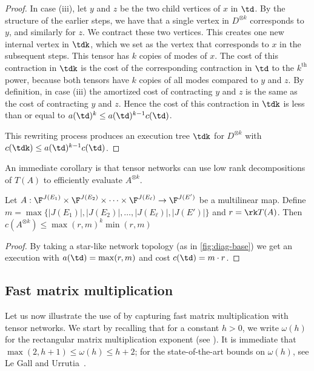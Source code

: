 \begin{proof}
In case (iii), let $y$ and $z$ be the two child vertices of $x$ in $\td$.
By the structure of the earlier steps, we have that a single vertex in
$D^{\otimes k}$ corresponds to $y$,
and similarly for $z$. We contract these two vertices. This creates one new
internal vertex in $\tdk$, which we set as the vertex that corresponds
to $x$ in the subsequent steps. This tensor has $k$ copies of modes of $x$. The cost of this contraction in $\tdk$ is the cost of the corresponding contraction in $\td$ to the $k^\text{th}$ power, because both tensors have $k$ copies of all modes compared to $y$ and $z$. By definition, in case (iii) the amortized cost of contracting $y$ and $z$ is the same as the cost of contracting $y$ and $z$. Hence the cost of this contraction in $\tdk$ is less than or equal to $a(\td)^k \leq a(\td)^{k-1} c(\td)$.

This rewriting process produces an execution tree $\tdk$
for $D^{\otimes k}$ with $c(\tdk)\leq a(\td)^{k-1} c(\td)$.
\end{proof}

An immediate corollary is that tensor networks can use low rank
decompositions of $T(A)$ to efficiently evaluate $A^{\otimes k}$.

\begin{corollary}
  \label{cor:low rank execution}
  Let $A: \F^{J(E_1)} \times \F^{J(E_2)} \times \cdots \times
  \F^{J(E_\ell)} \rightarrow \F^{J(E')}$ be a multilinear map.  Define
  $m \!=\! \max\{|J(E_1)|, |J(E_2)|, \ldots, |J(E_\ell)|, |J(E')|\}$ and
  $r = \rk T(A)$.  Then $c(A^{\otimes k}) \le \max(r, m)^{k} \min(r, m)$
\end{corollary}

\begin{proof}
  By taking a star-like network topology (as in \eqref{fig:diag-base})
  we get an execution with $a(\td) = \max(r, m)$ and cost $c(\td) = m \cdot
  r$.
\end{proof}



\subsection{Fast matrix multiplication}
\label{sec:matrix mul upper bound}

Let us now illustrate the use of  by capturing
fast matrix multiplication with tensor networks. We start by recalling that
for a constant $h>0$, we write $\omega(h)$ for the rectangular matrix
multiplication exponent
(see ). %
It is immediate that
$\max(2,h+1)\leq\omega(h)\leq h+2$; for the state-of-the-art bounds
on $\omega(h)$,
see Le Gall and Urrutia~\cite{LeGallU2017}. %

